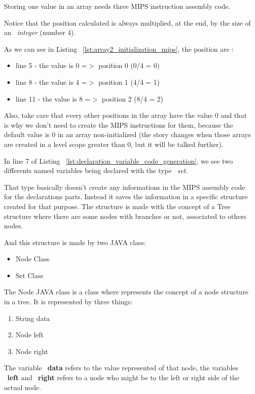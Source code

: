 \documentclass[
  oneside,
  11pt, a4paper,
  footinclude=true,
  headinclude=true,
  cleardoublepage=empty
]{scrbook}
\begin{document}
Storing one value in an array needs three MIPS instruction assembly code.

Notice that the position calculated is always multiplied, at the end, by the size of an ~\textit{integer} (number 4).

As we can see in Listing ~\ref{lst:array2_initialization_mips}, the position are :

\begin{itemize}
\item line 5 - the value is 0 =$>$ position 0 (0/4 = 0)
\item line 8 - the value is 4 =$>$ position 1 (4/4 = 1)
\item line 11 - the value is 8 =$>$ position 2 (8/4 = 2)
\end{itemize}

Also, take care that every other positions in the array have the value 0 and that is why we don't need to create the MIPS instructions for them, because the default value is 0 in an array non-initialized (the story changes when those arrays are created in a level scope greater than 0, but it will be talked further).

In line 7 of Listing ~\ref{lst:declaration_variable_code_generation}, we see two differents named variables being declared with the type ~\textit{set}.

That type basically doesn't create any informations in the MIPS assembly code for the declarations parts. Instead it saves the information in a specific structure created for that purpose. The structure is made with the concept of a Tree structure where there are some nodes with branches or not, associated to others nodes.

And this structure is made by two JAVA class:

\begin{itemize}
\item Node Class
\item Set Class
\end{itemize}

The Node JAVA class is a class where represents the concept of a node structure in a tree. It is represented by three things:
\begin{enumerate}
\item String data 
\item Node left
\item Node right
\end{enumerate}

The variable ~\textbf{data} refers to the value represented of that node, the variables ~\textbf{left} and ~\textbf{right} refers to a node who might be to the left or right side of the actual node.
\end{document}
